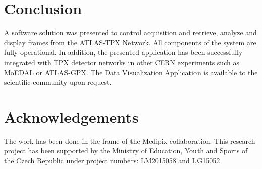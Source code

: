 \documentclass[conference]{IEEEtran}
\begin{document}
\section{\label{sec:conclusion}Conclusion}
A software solution was presented to control acquisition and retrieve, analyze and display frames from the ATLAS-TPX Network. All components of the system are fully operational. In addition, the presented application has been successfully integrated with TPX detector networks in other CERN experiments such as MoEDAL or ATLAS-GPX. The Data Visualization Application is available to the scientific community upon request.

\section*{\label{sec:acknowledgements}Acknowledgements}
The work has been done in the frame of the Medipix collaboration. This research project has been supported by the Ministry of Education, Youth and Sports of the Czech Republic under project numbers: LM2015058 and LG15052

%

%
\end{document}
